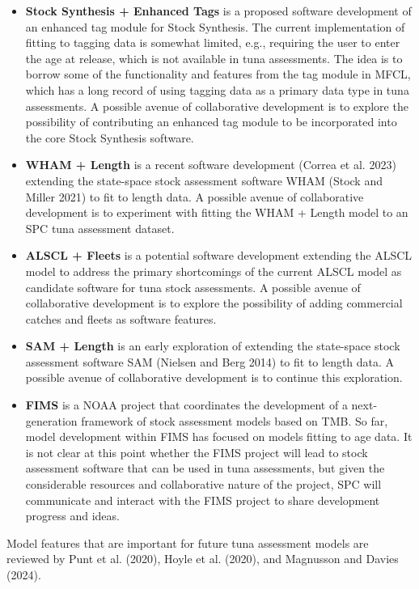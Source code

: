 \documentclass{SCreport}
\begin{document}
\begin{itemize}
  \item \textbf{Stock Synthesis + Enhanced Tags} is a proposed software
  development of an enhanced tag module for Stock Synthesis. The current
  implementation of fitting to tagging data is somewhat limited, e.g., requiring
  the user to enter the age at release, which is not available in tuna
  assessments. The idea is to borrow some of the functionality and features from
  the tag module in MFCL, which has a long record of using tagging data as a
  primary data type in tuna assessments. A possible avenue of collaborative
  development is to explore the possibility of contributing an enhanced tag
  module to be incorporated into the core Stock Synthesis software.
  \item \textbf{WHAM + Length} is a recent software development (Correa et al.
  2023) extending the state-space stock assessment software WHAM (Stock and
  Miller 2021) to fit to length data. A possible avenue of collaborative
  development is to experiment with fitting the WHAM + Length model to an SPC
  tuna assessment dataset.
  \item \textbf{ALSCL + Fleets} is a potential software development extending
  the ALSCL model to address the primary shortcomings of the current ALSCL model
  as candidate software for tuna stock assessments. A possible avenue of
  collaborative development is to explore the possibility of adding commercial
  catches and fleets as software features.
  \item \textbf{SAM + Length} is an early exploration of extending the
  state-space stock assessment software SAM (Nielsen and Berg 2014) to fit to
  length data. A possible avenue of collaborative development is to continue
  this exploration.
  \newpage
  \item \textbf{FIMS} is a NOAA project that coordinates the development of a
  next-generation framework of stock assessment models based on TMB. So far,
  model development within FIMS has focused on models fitting to age data. It is
  not clear at this point whether the FIMS project will lead to stock assessment
  software that can be used in tuna assessments, but given the considerable
  resources and collaborative nature of the project, SPC will communicate and
  interact with the FIMS project to share development progress and ideas.
\end{itemize}

Model features that are important for future tuna assessment models are reviewed
by Punt et al. (2020), Hoyle et al. (2020), and Magnusson and Davies (2024).
\end{document}
